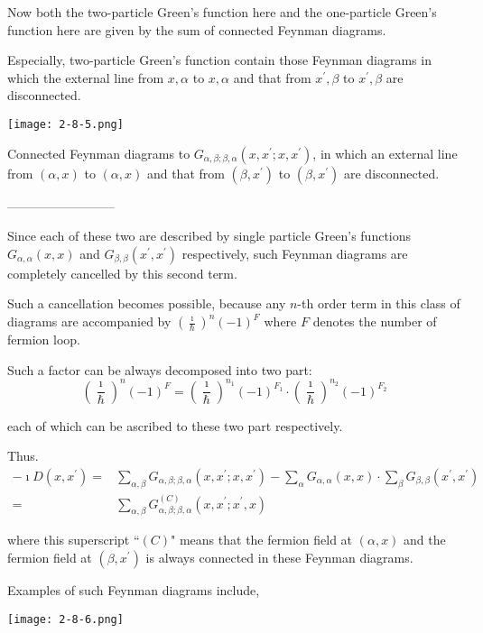 Now both the two-particle Green's function here and the one-particle Green's function here are given by the sum of connected Feynman diagrams.

Especially, two-particle Green's function contain those Feynman diagrams in which the external line from $x,\alpha$ to $x,\alpha$ and that from $x^{'},\beta$ to $x^{'},\beta$ are disconnected.

\begin{center} \label{Fig2.8.5}
\texttt{[image: 2-8-5.png]}
\end{center}

Connected Feynman diagrams to $G_{\alpha,\beta;\beta,\alpha}(x,x^{'};x,x^{'})$, in which an external line from $(\alpha,x)$ to $(\alpha,x)$ and that from $(\beta,x^{'})$ to $(\beta,x^{'})$ are disconnected.

\begin{center}--------------------------\end{center}

Since each of these two are described by single particle Green's functions $G_{\alpha,\alpha}(x,x)$ and $G_{\beta,\beta}(x^{'},x^{'})$ respectively, such Feynman diagrams are completely cancelled by this second term.

Such a cancellation becomes possible, because any $n$-th order term in this class of diagrams are accompanied by $\left(\frac{\imath}{\hbar}\right)^n (-1)^F$ where $F$ denotes the number of fermion loop.

Such a factor can be always decomposed into two part:
\[ \left(\frac{\imath}{\hbar}\right)^n (-1)^F=\left(\frac{\imath}{\hbar}\right)^{n_1} (-1)^{F_1}\cdot\left(\frac{\imath}{\hbar}\right)^{n_2} (-1)^{F_2} \]

each of which can be ascribed to these two part respectively.

Thus.
\[\begin{split}
-\imath D(x,x^{'})=& \sum_{\alpha,\beta} G_{\alpha,\beta;\beta,\alpha}(x,x^{'};x,x^{'}) - \sum_{\alpha}G_{\alpha,\alpha}(x,x)\cdot\sum_{\beta}G_{\beta,\beta}(x^{'},x^{'})\\
=& \sum_{\alpha,\beta}G_{\alpha,\beta;\beta,\alpha}^{(C)}(x,x^{'};x^{'},x)
\end{split}\]

where this superscript ``$(C)$" means that the fermion field at $(\alpha,x)$ and the fermion field at $(\beta,x^{'})$ is always connected in these Feynman diagrams.

Examples of such Feynman diagrams include,
\begin{center} \label{Fig2.8.6}
\texttt{[image: 2-8-6.png]}
\end{center}


